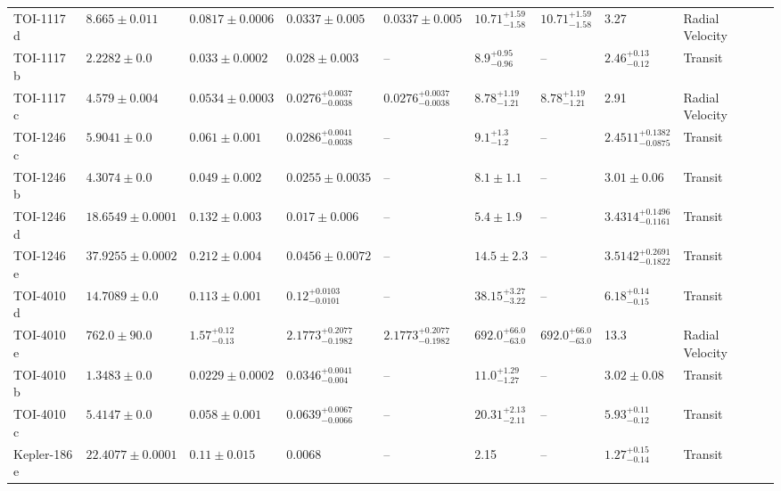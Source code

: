\begin{tabular}{llllllllll}
TOI-1117 d & $8.665 \pm 0.011$ & $0.0817 \pm 0.0006$ & $0.0337 \pm 0.005$ & $0.0337 \pm 0.005$ & $10.71^{+1.59}_{-1.58}$ & $10.71^{+1.59}_{-1.58}$ & 3.27 & Radial Velocity & \cite{LOCKLEY_ET_AL_2025} \\
TOI-1117 b & $2.2282 \pm 0.0$ & $0.033 \pm 0.0002$ & $0.028 \pm 0.003$ & -- & $8.9^{+0.95}_{-0.96}$ & -- & $2.46^{+0.13}_{-0.12}$ & Transit & \cite{LOCKLEY_ET_AL_2025} \\
TOI-1117 c & $4.579 \pm 0.004$ & $0.0534 \pm 0.0003$ & $0.0276^{+0.0037}_{-0.0038}$ & $0.0276^{+0.0037}_{-0.0038}$ & $8.78^{+1.19}_{-1.21}$ & $8.78^{+1.19}_{-1.21}$ & 2.91 & Radial Velocity & \cite{LOCKLEY_ET_AL_2025} \\
TOI-1246 c & $5.9041 \pm 0.0$ & $0.061 \pm 0.001$ & $0.0286^{+0.0041}_{-0.0038}$ & -- & $9.1^{+1.3}_{-1.2}$ & -- & $2.4511^{+0.1382}_{-0.0875}$ & Transit & \cite{POLANSKI_ET_AL__2024} \\
TOI-1246 b & $4.3074 \pm 0.0$ & $0.049 \pm 0.002$ & $0.0255 \pm 0.0035$ & -- & $8.1 \pm 1.1$ & -- & $3.01 \pm 0.06$ & Transit & \cite{TURTELBOOM_ET_AL_2022} \\
TOI-1246 d & $18.6549 \pm 0.0001$ & $0.132 \pm 0.003$ & $0.017 \pm 0.006$ & -- & $5.4 \pm 1.9$ & -- & $3.4314^{+0.1496}_{-0.1161}$ & Transit & \cite{POLANSKI_ET_AL__2024} \\
TOI-1246 e & $37.9255 \pm 0.0002$ & $0.212 \pm 0.004$ & $0.0456 \pm 0.0072$ & -- & $14.5 \pm 2.3$ & -- & $3.5142^{+0.2691}_{-0.1822}$ & Transit & \cite{POLANSKI_ET_AL__2024} \\
TOI-4010 d & $14.7089 \pm 0.0$ & $0.113 \pm 0.001$ & $0.12^{+0.0103}_{-0.0101}$ & -- & $38.15^{+3.27}_{-3.22}$ & -- & $6.18^{+0.14}_{-0.15}$ & Transit & \cite{KUNIMOTO_ET_AL__2023} \\
TOI-4010 e & $762.0 \pm 90.0$ & $1.57^{+0.12}_{-0.13}$ & $2.1773^{+0.2077}_{-0.1982}$ & $2.1773^{+0.2077}_{-0.1982}$ & $692.0^{+66.0}_{-63.0}$ & $692.0^{+66.0}_{-63.0}$ & 13.3 & Radial Velocity & \cite{KUNIMOTO_ET_AL__2023} \\
TOI-4010 b & $1.3483 \pm 0.0$ & $0.0229 \pm 0.0002$ & $0.0346^{+0.0041}_{-0.004}$ & -- & $11.0^{+1.29}_{-1.27}$ & -- & $3.02 \pm 0.08$ & Transit & \cite{KUNIMOTO_ET_AL__2023} \\
TOI-4010 c & $5.4147 \pm 0.0$ & $0.058 \pm 0.001$ & $0.0639^{+0.0067}_{-0.0066}$ & -- & $20.31^{+2.13}_{-2.11}$ & -- & $5.93^{+0.11}_{-0.12}$ & Transit & \cite{KUNIMOTO_ET_AL__2023} \\
Kepler-186 e & $22.4077 \pm 0.0001$ & $0.11 \pm 0.015$ & 0.0068 & -- & 2.15 & -- & $1.27^{+0.15}_{-0.14}$ & Transit & \cite{QUINTANA_ET_AL__2014} \\

\end{tabular}
